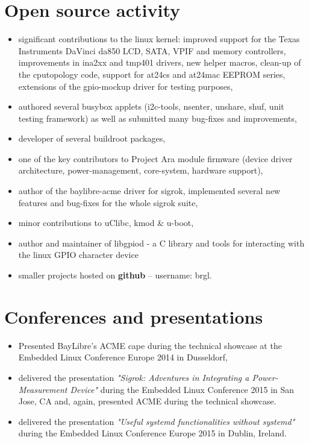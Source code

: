 \documentclass[10pt]{article}
\begin{document}
\section*{Open source activity}
\begin{itemize}
	\item significant contributions to the linux kernel: improved support for the Texas
	Instruments DaVinci da850 LCD, SATA, VPIF and memory controllers, improvements in ina2xx
	and tmp401 drivers, new helper macros, clean-up of the cputopology code, support for
	at24cs and at24mac EEPROM series, extensions of the gpio-mockup driver for testing
	purposes,
	\item authored several busybox applets (i2c-tools, nsenter, unshare, shuf, unit testing
	framework) as well as submitted many bug-fixes and improvements,
	\item developer of several buildroot packages,
	\item one of the key contributors to Project Ara module firmware (device driver
	architecture, power-management, core-system, hardware support),
	\item author of the baylibre-acme driver for sigrok, implemented several new features
	and bug-fixes for the whole sigrok suite,
	\item minor contributions to uClibc, kmod \& u-boot,
	\item author and maintainer of libgpiod - a C library and tools for interacting with
	the linux GPIO character device
	\item smaller projects hosted on \textbf{github} -- username: brgl.
\end{itemize}

\section*{Conferences and presentations}
\begin{itemize}
	\item Presented BayLibre's ACME cape during the technical showcase at the Embedded Linux
	Conference Europe 2014 in Dusseldorf,
	\item delivered the presentation \textit{"Sigrok: Adventures in Integrating a
	Power-Measurement Device"} during the Embedded Linux Conference 2015 in San Jose, CA and,
	again, presented ACME during the technical showcase.
	\item delivered the presentation \textit{"Useful systemd functionalities without systemd"}
	during the Embedded Linux Conference Europe 2015 in Dublin, Ireland.
\end{itemize}
\end{document}
